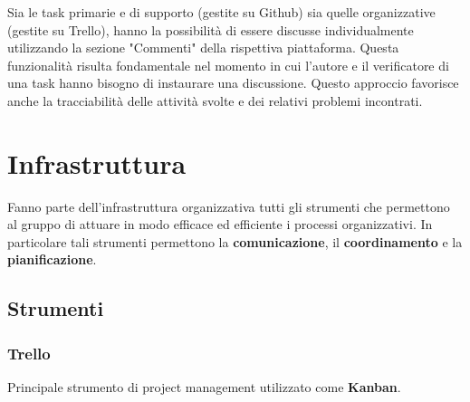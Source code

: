 Sia le task primarie e di supporto (gestite su Github) sia quelle organizzative (gestite su Trello), hanno la possibilità di essere discusse individualmente utilizzando la sezione "Commenti" della rispettiva piattaforma. Questa funzionalità risulta fondamentale nel momento in cui l'autore e il verificatore di una task hanno bisogno di instaurare una discussione. Questo approccio favorisce anche la tracciabilità delle attività svolte e dei relativi problemi incontrati.



\section{Infrastruttura}
\label{infrastruttura}
Fanno parte dell'infrastruttura organizzativa tutti gli strumenti che permettono al gruppo di attuare in modo efficace ed efficiente i processi organizzativi. In particolare tali strumenti permettono la \textbf{comunicazione}, il \textbf{coordinamento} e la \textbf{pianificazione}.

\subsection{Strumenti}
\subsubsection{Trello}
Principale strumento di project management utilizzato come \textbf{Kanban}. 

